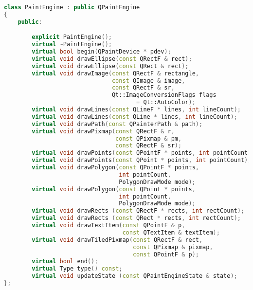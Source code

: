 \begin{lstlisting}[language=C++,numbers=none,caption=Implementacja klasy \emph{QPaintEngine}]
class PaintEngine : public QPaintEngine
{
    public:

        explicit PaintEngine();
        virtual ~PaintEngine();
        virtual bool begin(QPaintDevice * pdev);
        virtual void drawEllipse(const QRectF & rect);
        virtual void drawEllipse(const QRect & rect);
        virtual void drawImage(const QRectF & rectangle, 
                               const QImage & image, 
                               const QRectF & sr,
                               Qt::ImageConversionFlags flags 
                                      = Qt::AutoColor);
        virtual void drawLines(const QLineF * lines, int lineCount);
        virtual void drawLines(const QLine * lines, int lineCount);
        virtual void drawPath(const QPainterPath & path);
        virtual void drawPixmap(const QRectF & r, 
                                const QPixmap & pm, 
                                const QRectF & sr);
        virtual void drawPoints(const QPointF * points, int pointCount);
        virtual void drawPoints(const QPoint * points, int pointCount);
        virtual void drawPolygon(const QPointF * points, 
                                 int pointCount, 
                                 PolygonDrawMode mode);
        virtual void drawPolygon(const QPoint * points, 
                                 int pointCount, 
                                 PolygonDrawMode mode);
        virtual void drawRects (const QRectF * rects, int rectCount);
        virtual void drawRects (const QRect * rects, int rectCount);
        virtual void drawTextItem(const QPointF & p, 
                                  const QTextItem & textItem);
        virtual void drawTiledPixmap(const QRectF & rect, 
                                     const QPixmap & pixmap, 
                                     const QPointF & p);
        virtual bool end();
        virtual Type type() const;
        virtual void updateState (const QPaintEngineState & state);
};
\end{lstlisting}